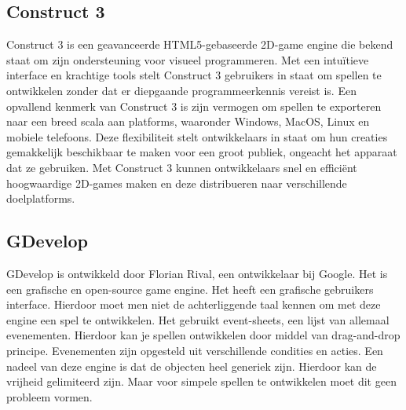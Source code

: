 \subsection{Construct 3}
Construct 3 is een geavanceerde HTML5-gebaseerde 2D-game engine die bekend staat om zijn ondersteuning voor visueel programmeren. Met een intuïtieve interface en krachtige tools stelt Construct 3 gebruikers in staat om spellen te ontwikkelen zonder dat er diepgaande programmeerkennis vereist is. Een opvallend kenmerk van Construct 3 is zijn vermogen om spellen te exporteren naar een breed scala aan platforms, waaronder Windows, MacOS, Linux en mobiele telefoons. Deze flexibiliteit stelt ontwikkelaars in staat om hun creaties gemakkelijk beschikbaar te maken voor een groot publiek, ongeacht het apparaat dat ze gebruiken. Met Construct 3 kunnen ontwikkelaars snel en efficiënt hoogwaardige 2D-games maken en deze distribueren naar verschillende doelplatforms. \autocite{enwiki:1200994136}

\subsection{GDevelop}
GDevelop is ontwikkeld door Florian Rival, een ontwikkelaar bij Google. Het is een grafische en open-source game engine. Het heeft een grafische gebruikers interface. Hierdoor moet men niet de achterliggende taal kennen om met deze engine een spel te ontwikkelen. Het gebruikt event-sheets, een lijst van allemaal evenementen. Hierdoor kan je spellen ontwikkelen door middel van drag-and-drop principe. Evenementen zijn opgesteld uit verschillende condities en acties. Een nadeel van deze engine is dat de objecten heel generiek zijn. Hierdoor kan de vrijheid gelimiteerd zijn. Maar voor simpele spellen te ontwikkelen moet dit geen probleem vormen.\autocite{mohd2023analyzing}